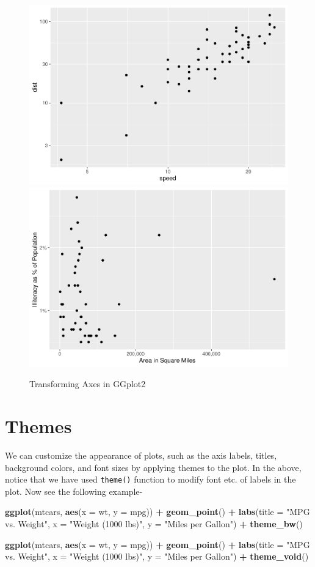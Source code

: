 \documentclass[
]{book}
\newenvironment{Shaded}{\begin{snugshade}}{\end{snugshade}}
\newcommand{\AttributeTok}[1]{\textcolor[rgb]{0.13,0.29,0.53}{#1}}
\newcommand{\FunctionTok}[1]{\textcolor[rgb]{0.13,0.29,0.53}{\textbf{#1}}}
\newcommand{\NormalTok}[1]{#1}
\newcommand{\SpecialCharTok}[1]{\textcolor[rgb]{0.81,0.36,0.00}{\textbf{#1}}}
\newcommand{\StringTok}[1]{\textcolor[rgb]{0.31,0.60,0.02}{#1}}
\begin{document}
\begin{figure}

{\centering \includegraphics[width=0.49\linewidth]{DauR_files/figure-latex/scale2-1} \includegraphics[width=0.49\linewidth]{DauR_files/figure-latex/scale2-2} 

}

\caption{Transforming Axes in GGplot2}\label{fig:scale2}
\end{figure}

\hypertarget{themes}{%
\section{Themes}\label{themes}}

We can customize the appearance of plots, such as the axis labels, titles, background colors, and font sizes by applying themes to the plot. In the above, notice that we have used \texttt{theme()} function to modify font etc. of labels in the plot. Now see the following example-

\begin{Shaded}
\begin{Highlighting}[]
\FunctionTok{ggplot}\NormalTok{(mtcars, }\FunctionTok{aes}\NormalTok{(}\AttributeTok{x =}\NormalTok{ wt, }\AttributeTok{y =}\NormalTok{ mpg)) }\SpecialCharTok{+}
  \FunctionTok{geom\_point}\NormalTok{() }\SpecialCharTok{+}
  \FunctionTok{labs}\NormalTok{(}\AttributeTok{title =} \StringTok{"MPG vs. Weight"}\NormalTok{,}
       \AttributeTok{x =} \StringTok{"Weight (1000 lbs)"}\NormalTok{,}
       \AttributeTok{y =} \StringTok{"Miles per Gallon"}\NormalTok{) }\SpecialCharTok{+}
  \FunctionTok{theme\_bw}\NormalTok{()}

\FunctionTok{ggplot}\NormalTok{(mtcars, }\FunctionTok{aes}\NormalTok{(}\AttributeTok{x =}\NormalTok{ wt, }\AttributeTok{y =}\NormalTok{ mpg)) }\SpecialCharTok{+}
  \FunctionTok{geom\_point}\NormalTok{() }\SpecialCharTok{+}
  \FunctionTok{labs}\NormalTok{(}\AttributeTok{title =} \StringTok{"MPG vs. Weight"}\NormalTok{,}
       \AttributeTok{x =} \StringTok{"Weight (1000 lbs)"}\NormalTok{,}
       \AttributeTok{y =} \StringTok{"Miles per Gallon"}\NormalTok{) }\SpecialCharTok{+}
  \FunctionTok{theme\_void}\NormalTok{()}
\end{Highlighting}
\end{Shaded}
\end{document}
